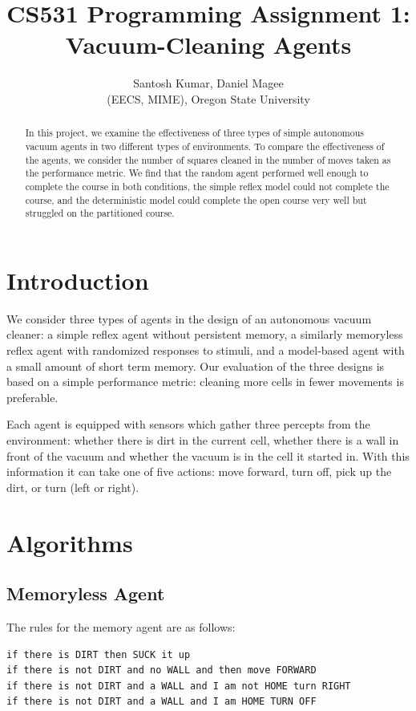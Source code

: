 \documentclass[12pt]{article}
\title{CS531 Programming Assignment 1: Vacuum-Cleaning Agents}
\author{
        Santosh Kumar, Daniel Magee \\
        (EECS, MIME), Oregon State University\\
}
\begin{document}
\maketitle

\begin{abstract}
In this project, we examine the effectiveness of three types of simple autonomous vacuum agents in two different types of environments. 
To compare the effectiveness of the agents, we consider the number of squares cleaned in the number of moves taken as the performance metric.
We find that the random agent performed well enough to complete the course in both conditions, the simple reflex model could not complete the course, and the deterministic model could complete the open course very well but struggled on the partitioned course.
\end{abstract}

\section{Introduction}

We consider three types of agents in the design of an autonomous vacuum cleaner: a simple reflex agent without persistent memory, a similarly memoryless reflex agent with randomized responses to stimuli, and a model-based agent with a small amount of short term memory.  
Our evaluation of the three designs is based on a simple performance metric: cleaning more cells in fewer movements is preferable.

Each agent is equipped with sensors which gather three percepts from the environment: whether there is dirt in the current cell, whether there is a wall in front of the vacuum and whether the vacuum is in the cell it started in.  
With this information it can take one of five actions: move forward, turn off, pick up the dirt, or turn (left or right).




\section{Algorithms}

\subsection{Memoryless Agent}

The rules for the memory agent are as follows:
\begin{verbatim}
if there is DIRT then SUCK it up 
if there is not DIRT and no WALL and then move FORWARD
if there is not DIRT and a WALL and I am not HOME turn RIGHT
if there is not DIRT and a WALL and I am HOME TURN OFF
\end{verbatim}
\end{document}
